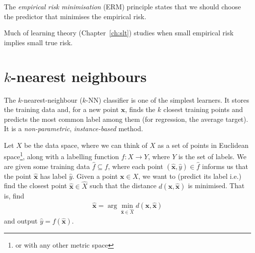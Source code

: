 \documentclass[a4paper, 12pt]{book}
\begin{document}
\begin{principle}
The \emph{empirical risk minimisation} (ERM) principle states that we should choose the predictor that minimises the empirical risk.
\end{principle}
Much of learning theory (Chapter~\ref{ch:slt}) studies when small empirical risk implies small true risk.

\section{\texorpdfstring{$k$}{k}-nearest neighbours}

The $k$-nearest-neighbour ($k$-NN) classifier is one of the simplest learners. It stores the training data and, for a new point $\mathbf{x}$, finds the $k$ closest training points and predicts the most common label among them (for regression, the average target). It is a \emph{non-parametric}, \emph{instance-based} method. 


\begin{problem}
   Let $X$ be the data space, where we can think of $X$ as a set of points in Euclidean space\footnote{or with any other metric space}, along with a labelling function $f: X \longrightarrow Y$, where $Y$ is the set of labels. We are given some training data $\hat{f} \subseteq f$, where each point $(\hat{\mathbf{x}}, \hat{y}) \in \hat{f}$ informs us that the point $\hat{\mathbf{x}}$ has label $\hat{y}$. Given a point $\mathbf{x} \in X$, we want to (predict its label i.e.) find the closest point $\hat{\mathbf{x}} \in \hat{X}$ such that the distance $d(\mathbf{x}, \hat{\mathbf{x}})$ is minimised. That is, find 
   \begin{align}
        \hat{\mathbf{x}} = \arg\min_{\hat{\mathbf{x}} \in \hat{X}} d(\mathbf{x}, \hat{\mathbf{x}})
   \end{align}
   and output $\hat{y} = f(\hat{\mathbf{x}})$.
\end{problem}
\end{document}
